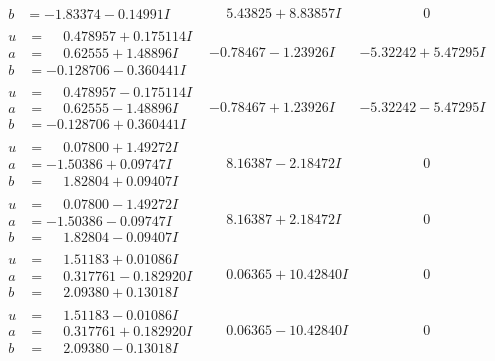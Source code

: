 \documentclass[1p]{elsarticle_modified}
\theoremstyle{definition}
\begin{document}
$$\begin{array}{c|c|c}
\begin{aligned}
b &= -1.83374 - 0.14991 I\end{aligned}
 & \phantom{-}5.43825 + 8.83857 I & \phantom{-0.000000 } 0 \\ \hline\begin{aligned}
u &= \phantom{-}0.478957 + 0.175114 I \\
a &= \phantom{-}0.62555 + 1.48896 I \\
b &= -0.128706 - 0.360441 I\end{aligned}
 & -0.78467 - 1.23926 I & -5.32242 + 5.47295 I \\ \hline\begin{aligned}
u &= \phantom{-}0.478957 - 0.175114 I \\
a &= \phantom{-}0.62555 - 1.48896 I \\
b &= -0.128706 + 0.360441 I\end{aligned}
 & -0.78467 + 1.23926 I & -5.32242 - 5.47295 I \\ \hline\begin{aligned}
u &= \phantom{-}0.07800 + 1.49272 I \\
a &= -1.50386 + 0.09747 I \\
b &= \phantom{-}1.82804 + 0.09407 I\end{aligned}
 & \phantom{-}8.16387 - 2.18472 I & \phantom{-0.000000 } 0 \\ \hline\begin{aligned}
u &= \phantom{-}0.07800 - 1.49272 I \\
a &= -1.50386 - 0.09747 I \\
b &= \phantom{-}1.82804 - 0.09407 I\end{aligned}
 & \phantom{-}8.16387 + 2.18472 I & \phantom{-0.000000 } 0 \\ \hline\begin{aligned}
u &= \phantom{-}1.51183 + 0.01086 I \\
a &= \phantom{-}0.317761 - 0.182920 I \\
b &= \phantom{-}2.09380 + 0.13018 I\end{aligned}
 & \phantom{-}0.06365 + 10.42840 I & \phantom{-0.000000 } 0 \\ \hline\begin{aligned}
u &= \phantom{-}1.51183 - 0.01086 I \\
a &= \phantom{-}0.317761 + 0.182920 I \\
b &= \phantom{-}2.09380 - 0.13018 I\end{aligned}
 & \phantom{-}0.06365 - 10.42840 I & \phantom{-0.000000 } 0 \\ \hline\begin{aligned}

\end{aligned}
\end{array}$$
\end{document}
